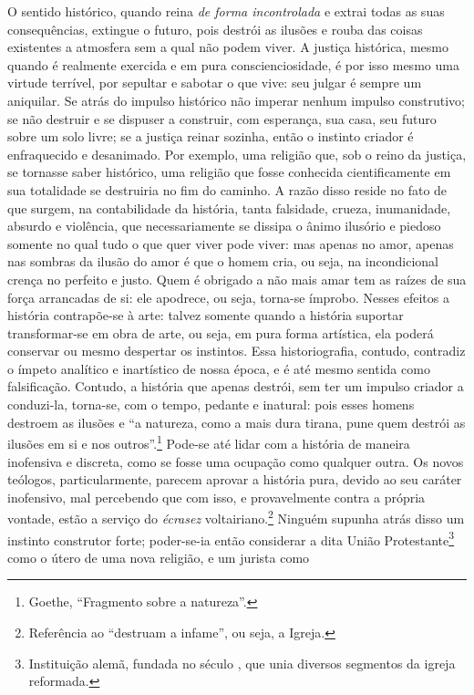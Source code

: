 O sentido histórico, quando reina \emph{de forma incontrolada} e extrai
todas as suas consequências, extingue o futuro, pois destrói as ilusões
e rouba das coisas existentes a atmosfera sem a qual não podem viver. A
justiça histórica, mesmo quando é realmente exercida e em pura
conscienciosidade, é por isso mesmo uma virtude terrível, por sepultar e
sabotar o que vive: seu julgar é sempre um aniquilar. Se atrás do
impulso histórico não imperar nenhum impulso construtivo; se não
destruir e se dispuser a construir, com esperança, sua casa, seu futuro
sobre um solo livre; se a justiça reinar sozinha, então o instinto
criador é enfraquecido e desanimado. Por exemplo, uma religião que, sob
o reino da justiça, se tornasse saber histórico, uma religião que fosse
conhecida cientificamente em sua totalidade se destruiria no fim do
caminho. A razão disso reside no fato de que surgem, na contabilidade da
história, tanta falsidade, crueza, inumanidade, absurdo e violência, que
necessariamente se dissipa o ânimo ilusório e piedoso somente no qual
tudo o que quer viver pode viver: mas apenas no amor, apenas nas sombras
da ilusão do amor é que o homem cria, ou seja, na incondicional crença
no perfeito e justo. Quem é obrigado a não mais amar tem as raízes de
sua força arrancadas de si: ele apodrece, ou seja, torna-se ímprobo.
Nesses efeitos a história contrapõe-se à arte: talvez somente quando a
história suportar transformar-se em obra de arte, ou seja, em pura forma
artística, ela poderá conservar ou mesmo despertar os instintos. Essa
historiografia, contudo, contradiz o ímpeto analítico e inartístico de
nossa época, e é até mesmo sentida como falsificação. Contudo, a
história que apenas destrói, sem ter um impulso criador a conduzi-la,
torna-se, com o tempo, pedante e inatural: pois esses homens destroem as
ilusões e ``a natureza, como a mais dura tirana, pune quem destrói as
ilusões em si e nos outros''.\footnote{Goethe, ``Fragmento sobre a
  natureza''.} Pode-se até lidar com a história de maneira inofensiva
e discreta, como se fosse uma ocupação como qualquer outra. Os novos
teólogos, particularmente, parecem aprovar a história pura, devido ao
seu caráter inofensivo, mal percebendo que com isso, e provavelmente
contra a própria vontade, estão a serviço do \emph{écrasez}
voltairiano.\footnote{Referência ao ``destruam a infame'', ou seja, a
  Igreja.} Ninguém supunha atrás disso um instinto construtor forte;
poder-se-ia então considerar a dita União Protestante\footnote{Instituição
  alemã, fundada no século , que unia diversos segmentos da igreja
  reformada.} como o útero de uma nova religião, e um jurista como

